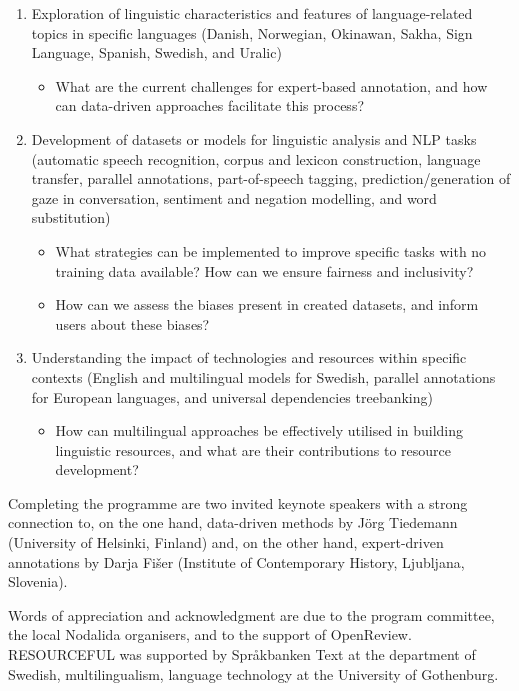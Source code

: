 \begin{enumerate}
    \item Exploration of linguistic characteristics and features of language-related topics in specific languages (Danish, Norwegian, Okinawan, Sakha, Sign Language, Spanish, Swedish, and Uralic)
    \begin{itemize}
        \item What are the current challenges for expert-based annotation, and how can data-driven approaches facilitate this process?
    \end{itemize}
    \item Development of datasets or models for linguistic analysis and NLP tasks (automatic speech recognition, corpus and lexicon construction, language transfer, parallel annotations, part-of-speech tagging, prediction/generation of gaze in conversation, sentiment and negation modelling, and word substitution)
    \begin{itemize}
        \item What strategies can be implemented to improve specific tasks with no training data available? How can we ensure fairness and inclusivity?
        \item How can we assess the biases present in created datasets, and inform users about these biases?
    \end{itemize}
    \item Understanding the impact of technologies and resources within specific contexts (English and multilingual models for Swedish, parallel annotations for European languages, and universal dependencies treebanking)
    \begin{itemize}
        \item How can multilingual approaches be effectively utilised in building linguistic resources, and what are their contributions to resource development?
    \end{itemize}    
\end{enumerate}

Completing the programme are two invited keynote speakers with a strong connection to, on the one hand, data-driven methods by Jörg Tiedemann (University of Helsinki, Finland) and, on the other hand, expert-driven annotations by Darja Fišer (Institute of Contemporary History, Ljubljana, Slovenia).
\vspace{2ex}

Words of appreciation and acknowledgment are due to the program committee, the local Nodalida organisers, and to the support of OpenReview.
RESOURCEFUL was supported by Språkbanken Text at the department of Swedish, multilingualism, language technology at the University of Gothenburg.
\vspace{7ex}

